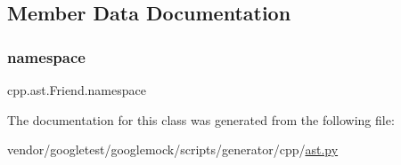 \subsection{Member Data Documentation}
\mbox{\label{classcpp_1_1ast_1_1_friend_a076c68dddae9bd1e24d224d005538014}} 
\subsubsection{\texorpdfstring{namespace}{namespace}}
{\footnotesize\ttfamily cpp.\+ast.\+Friend.\+namespace}



The documentation for this class was generated from the following file\+:\begin{DoxyCompactItemize}
\item 
vendor/googletest/googlemock/scripts/generator/cpp/\hyperlink{ast_8py}{ast.\+py}\end{DoxyCompactItemize}
